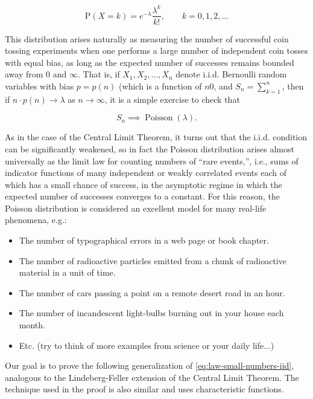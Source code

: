 \documentclass[11pt]{report}
\theoremstyle{plain}
\theoremstyle{definition}
\begin{document}
\[
\mathrm{P}(X=k) = e^{-\lambda} \frac{\lambda^k}{k!}, \qquad k=0,1,2,\ldots
\]

\noindent This distribution arises naturally as measuring the
number of successful coin tossing experiments when one
performs a large number of independent coin tosses
with equal bias, as long as the expected number of
successes remains bounded away from $0$ and $\infty$.
That is, if $X_1,X_2,\ldots,X_n$ denote i.i.d.
Bernoulli random variables with bias $p=p(n)$ (which
is a function of $n$0, and $S_n=\sum_{k=1}^n$, then
if $n\cdot p(n) \to \lambda$ as $n\to\infty$, it is a
simple exercise to check that

\begin{equation*}
\tag{20}\label{eq:law-small-numbers-iid}
S_n \implies \operatorname{Poisson}(\lambda).
\end{equation*}

\noindent As in the case of the Central Limit Theorem, it turns
out that the i.i.d. condition can be significantly
weakened, so in fact the Poisson distribution arises
almost universally as the limit law for counting
numbers of ``rare events,'', i.e., sums of indicator
functions of many independent or weakly correlated
events each of which has a small chance of success, in
the asymptotic regime in which the expected number of
successes converges to a constant. For this reason,
the Poisson distribution is considered an excellent
model for many real-life phenomena, e.g.:

\begin{itemize}
\item The number of typographical errors in a web page or
book chapter.

\item The number of radioactive particles emitted from a
chunk of radioactive material in a unit of time.

\item The number of cars passing a point on a remote desert
road in an hour.

\item The number of incandescent light-bulbs burning out in
your house each month.

\item Etc. (try to think of more examples from science or
your daily life...)
\end{itemize}

\noindent Our goal is to prove the following generalization of
\eqref{eq:law-small-numbers-iid}, analogous to the
Lindeberg-Feller extension of the Central Limit
Theorem. The technique used in the proof is also
similar and uses characteristic functions.
\end{document}
